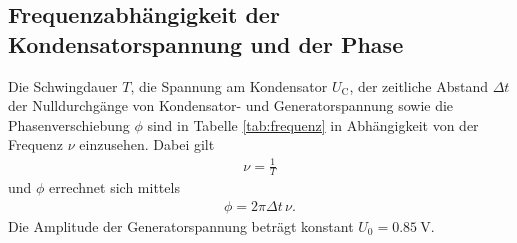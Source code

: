 \subsection{Frequenzabhängigkeit der Kondensatorspannung und der Phase}
Die Schwingdauer $T$, die Spannung am Kondensator $U_\text{C}$, der zeitliche Abstand $\Delta t$ der Nulldurchgänge von
Kondensator- und Generatorspannung sowie die Phasenverschiebung $\phi$ sind in Tabelle \ref{tab:frequenz} in Abhängigkeit von 
der Frequenz $\nu$ einzusehen.
Dabei gilt 
\begin{align*}
    \nu = \frac{1}{T}
\end{align*}
und $\phi$ errechnet sich mittels
\begin{align*}
    \phi = 2 \pi \Delta t \, \nu.
\end{align*}
Die Amplitude der Generatorspannung beträgt konstant $U_0 = \qty{0.85}{\volt}$.
%
